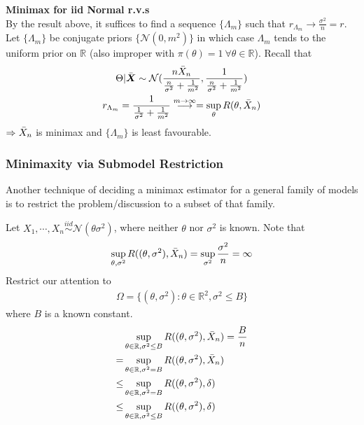 \begin{example}
    \textbf{Minimax for iid Normal r.v.s}\\
    By the result above,
    it suffices to find a sequence $\{\Lambda_m\}$ such that $r_{\Lambda_m}\to\frac{\sigma^2}{n}=r$.
    Let $\{\Lambda_m\}$ be conjugate priors $\{\mathcal{N}(0,m^2)\}$ 
    in which case $\Lambda_m$ tends to the uniform prior on $\mathbb{R}$ 
    (also improper with $\pi(\theta)=1~\forall{\theta}\in\mathbb{R}$).
    Recall that 
    \begin{gather}
        \Theta|\Bar{\boldsymbol{X}}\sim \mathcal{N}(
            \frac{n\Bar{X}_n}{\frac{n}{\sigma^2}+\frac{1}{m^2}},
            \frac{1}{\frac{n}{\sigma^2}+\frac{1}{m^2}})\\
        r_{\Lambda_m}=\frac{1}{\frac{1}{\sigma^2}+\frac{1}{m^2}}
        \overset{m\to\infty}{\longrightarrow}=\sup_\theta{R(\theta,\Bar{X}_n)}
    \end{gather}
    $\Rightarrow\Bar{X}_n$ is minimax and $\{\Lambda_m\}$ is least favourable.
\end{example}

\subsubsection{Minimaxity via Submodel Restriction}

Another technique of deciding a minimax estimator for a general family of models 
is to restrict the problem/discussion to a subset of that family.

\begin{example}
    Let $X_1,\cdots,X_n\overset{iid}{\sim}\mathcal{N}(\theta\sigma^2)$,
    where neither $\theta$ nor $\sigma^2$ is known.
    Note that 
    \begin{gather}
        \sup_{\theta,\sigma^2}R((\theta,\sigma^2),\Bar{X}_n)=\sup_{\sigma^2}\frac{\sigma^2}{n}=\infty
    \end{gather}
    Restrict our attention to 
    \begin{gather}
        \Omega=\{(\theta,\sigma^2):\theta\in\mathbb{R}^2,\sigma^2\leq B\}
    \end{gather}
    where $B$ is a known constant.
    \begin{align}
        &\sup_{\theta\in\mathbb{R},\sigma^2\leq{B}}R((\theta,\sigma^2),\Bar{X}_n)=\frac{B}{n} \\
        =& \sup_{\theta\in\mathbb{R},\sigma^2=B}R((\theta,\sigma^2),\Bar{X}_n) \\
        \leq& \sup_{\theta\in\mathbb{R},\sigma^2=B}R((\theta,\sigma^2),\delta) \\
        \leq& \sup_{\theta\in\mathbb{R},\sigma^2\leq{B}}R((\theta,\sigma^2),\delta)
    \end{align}
\end{example}

